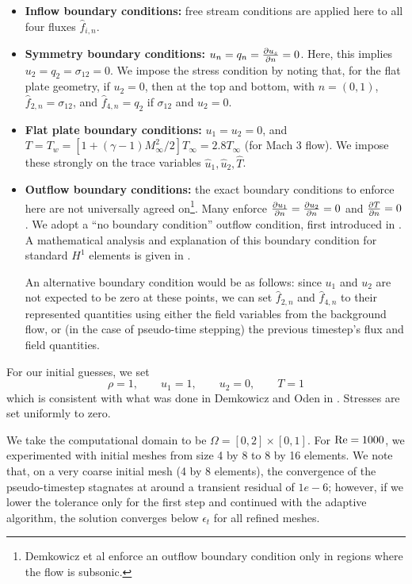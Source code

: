 \begin{itemize}
\item \textbf{Inflow boundary conditions:} free stream conditions are applied here to all four fluxes $\widehat{f}_{i,n}$.
\item \textbf{Symmetry boundary conditions:} $u_n = q_n = \pd{u_s}{n} = 0$. Here, this implies $u_2 = q_2 = \sigma_{12} = 0$. We impose the stress condition by noting that, for the flat plate geometry, if $u_2 = 0$, then at the top and bottom, with $n = (0,1)$, $\widehat{f}_{2,n} = \sigma_{12}$, and $\widehat{f}_{4,n} = q_2$ if $\sigma_{12}$ and $u_2 = 0$. 
\item \textbf{Flat plate boundary conditions:} $u_1 = u_2 = 0$, and $T = T_w = \left[1+(\gamma-1)M_\infty^2/2\right] T_\infty = 2.8T_\infty$ (for Mach 3 flow). We impose these strongly on the trace variables $\widehat{u}_1, \widehat{u}_2, \widehat{T}$. 
\item \textbf{Outflow boundary conditions:} the exact boundary conditions to enforce here are not universally agreed on\footnote{Demkowicz et al enforce an outflow boundary condition only in regions where the flow is subsonic.\cite{Demkowicz:1990:NFE:112271.112276}}. Many enforce $\pd{u_1}{n}=\pd{u_2}{n}=0$ and $\pd{T}{n} = 0$. We adopt a ``no boundary condition'' outflow condition, first introduced in \cite{FLD:FLD1650140506}. A mathematical analysis and explanation of this boundary condition for standard $H^1$ elements is given in \cite{FLD:FLD505}. 

An alternative boundary condition would be as follows: since $u_1$ and $u_2$ are not expected to be zero at these points, we can set $\widehat{f}_{2,n}$ and $\widehat{f}_{4,n}$ to their represented quantities using either the field variables from the background flow, or (in the case of pseudo-time stepping) the previous timestep's flux and field quantities. 

\end{itemize}

For our initial guesses, we set
\[
\rho = 1,\qquad u_1= 1,\qquad u_2 = 0, \qquad T = 1
\]
which is consistent with what was done in Demkowicz and Oden in \cite{Demkowicz:1990:NFE:112271.112276}. Stresses are set uniformly to zero.

We take the computational domain to be $\Omega = [0,2]\times[0,1]$. For $\Reyn = 1000$, we experimented with initial meshes from size 4 by 8 to 8 by 16 elements. We note that, on a very coarse initial mesh (4 by 8 elements), the convergence of the pseudo-timestep stagnates at around a transient residual of $1e-6$; however, if we lower the tolerance only for the first step and continued with the adaptive algorithm, the solution converges below $\epsilon_t$ for all refined meshes. 

